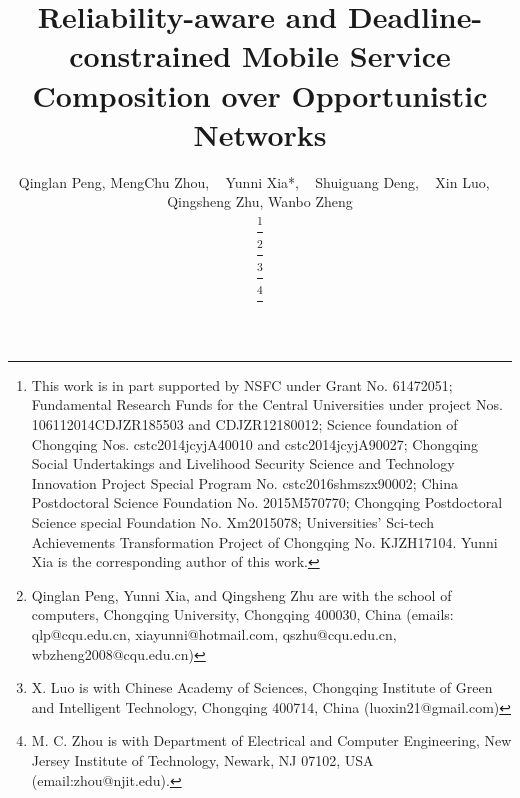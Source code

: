 \documentclass[journal]{IEEEtran}
\begin{document}
\title{Reliability-aware and Deadline-constrained Mobile Service Composition over Opportunistic Networks}

\author{Qinglan Peng,
        MengChu Zhou, ~
        Yunni Xia{*}, ~
        Shuiguang Deng, ~
        Xin Luo, ~
        Qingsheng Zhu,
        Wanbo Zheng


\thanks{This work is in part supported by NSFC under Grant No. 61472051; Fundamental Research Funds for the Central Universities under project Nos. 106112014CDJZR185503 and CDJZR12180012; Science foundation of
Chongqing Nos. cstc2014jcyjA40010 and cstc2014jcyjA90027; Chongqing Social Undertakings and Livelihood Security Science and Technology Innovation Project Special Program No. cstc2016shmszx90002; China Postdoctoral Science Foundation No. 2015M570770; Chongqing Postdoctoral Science special Foundation No. Xm2015078; Universities’ Sci-tech Achievements Transformation Project of Chongqing No. KJZH17104. Yunni Xia is the corresponding author of this work.}

\thanks{Qinglan Peng, Yunni Xia, and Qingsheng Zhu are with the school of computers, Chongqing University, Chongqing 400030, China (emails: qlp@cqu.edu.cn, xiayunni@hotmail.com, qszhu@cqu.edu.cn, wbzheng2008@cqu.edu.cn)}

\thanks{X. Luo is with Chinese Academy of Sciences, Chongqing Institute of Green and Intelligent
Technology, Chongqing 400714, China (luoxin21@gmail.com)}

\thanks{M. C. Zhou is with Department of Electrical and Computer Engineering, New Jersey Institute of Technology, Newark, NJ 07102, USA (email:zhou@njit.edu).}


}




\maketitle
\end{document}
